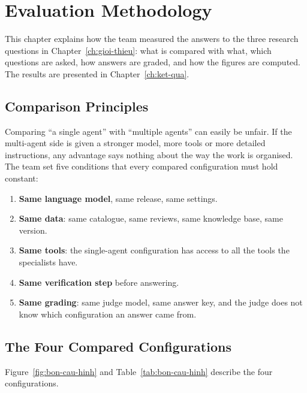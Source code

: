 \chapter{Evaluation Methodology}
\label{ch:phuong-phap}

This chapter explains how the team measured the answers to the three research questions in Chapter~\ref{ch:gioi-thieu}: what is compared with what, which questions are asked, how answers are graded, and how the figures are computed. The results are presented in Chapter~\ref{ch:ket-qua}.

\section{Comparison Principles}

Comparing ``a single agent'' with ``multiple agents'' can easily be unfair. If the multi-agent side is given a stronger model, more tools or more detailed instructions, any advantage says nothing about the way the work is organised. The team set five conditions that every compared configuration must hold constant:

\begin{enumerate}
    \item \textbf{Same language model}, same release, same settings.
    \item \textbf{Same data}: same catalogue, same reviews, same knowledge base, same version.
    \item \textbf{Same tools}: the single-agent configuration has access to all the tools the specialists have.
    \item \textbf{Same verification step} before answering.
    \item \textbf{Same grading}: same judge model, same answer key, and the judge does not know which configuration an answer came from.
\end{enumerate}

\section{The Four Compared Configurations}
\label{sec:bon-cau-hinh}

Figure~\ref{fig:bon-cau-hinh} and Table~\ref{tab:bon-cau-hinh} describe the four configurations.


